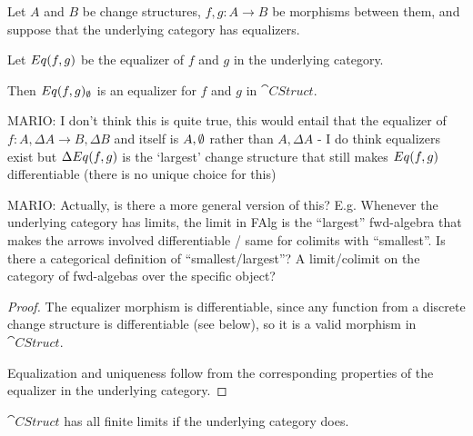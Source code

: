 \begin{prop}[Equalizers]
  Let $A$ and $B$ be change structures, $f, g: A \rightarrow B$ be morphisms
  between them, and suppose that the underlying category has equalizers.

  Let $Eq(f, g)$ be the equalizer of $f$ and $g$ in the underlying category.

  Then $Eq(f, g)_\emptyset$ is an equalizer for $f$ and $g$
  in $\cat{CStruct}$.

  MARIO: I don't think this is quite true, this would entail that the equalizer of
  $f : A, \Delta A \rightarrow B,\Delta B$ and itself is $A, \emptyset$ rather than
  $A, \Delta A$ - I do think equalizers exist but $\Delta Eq(f, g)$ is the
  `largest' change structure that still makes $Eq(f, g)$ differentiable (there
  is no unique choice for this)

  MARIO: Actually, is there a more general version of this? E.g. Whenever the underlying
  category has limits, the limit in FAlg is the ``largest'' fwd-algebra that makes the arrows
  involved differentiable / same for colimits with ``smallest''. Is there a categorical definition
  of ``smallest/largest''? A limit/colimit on the category of fwd-algebas over the specific object?
\end{prop}
\begin{proof}
  The equalizer morphism is differentiable, since any function from a discrete change
  structure is differentiable (see below), so it is a valid morphism in $\cat{CStruct}$.

  Equalization and uniqueness follow from the corresponding properties of the
  equalizer in the underlying category.
\end{proof}

\begin{thm}
  $\cat{CStruct}$ has all finite limits if the underlying category does.
\end{thm}

